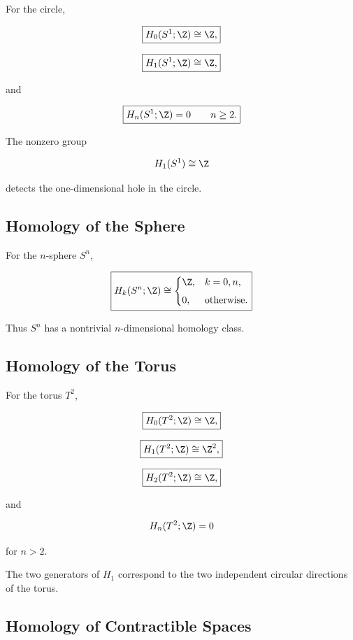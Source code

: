 For the circle,

\[
\boxed{
H_0(S^1;\Z)\cong\Z,
}
\]

\[
\boxed{
H_1(S^1;\Z)\cong\Z,
}
\]

and

\[
\boxed{
H_n(S^1;\Z)=0
\qquad
n\geq2.
}
\]

The nonzero group

\[
H_1(S^1)\cong\Z
\]

detects the one-dimensional hole in the circle.

\subsection{Homology of the Sphere}
\label{subsec:homology-sphere}

For the \(n\)-sphere \(S^n\),

\[
\boxed{
H_k(S^n;\Z)
\cong
\begin{cases}
\Z,
&
k=0,n,
\\[4pt]
0,
&
\text{otherwise}.
\end{cases}
}
\]

Thus \(S^n\) has a nontrivial \(n\)-dimensional homology class.

\subsection{Homology of the Torus}
\label{subsec:homology-torus}

For the torus \(T^2\),

\[
\boxed{
H_0(T^2;\Z)\cong\Z,
}
\]

\[
\boxed{
H_1(T^2;\Z)\cong\Z^2,
}
\]

\[
\boxed{
H_2(T^2;\Z)\cong\Z,
}
\]

and

\[
H_n(T^2;\Z)=0
\]

for \(n>2\).

The two generators of \(H_1\) correspond to the two independent circular
directions of the torus.

\subsection{Homology of Contractible Spaces}
\label{subsec:homology-contractible}

